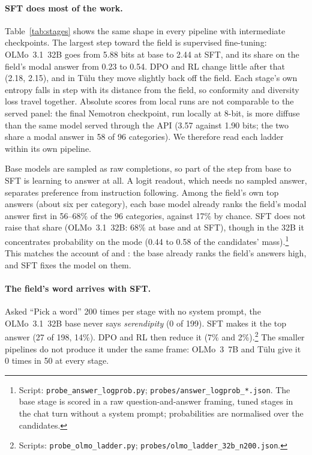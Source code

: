\documentclass[11pt]{article}
\begin{document}
\paragraph{SFT does most of the work.}
Table~\ref{tab:stages} shows the same shape in every pipeline with intermediate checkpoints. The largest step toward the field is supervised fine-tuning: OLMo~3.1~32B goes from 5.88 bits at base to 2.44 at SFT, and its share on the field's modal answer from 0.23 to 0.54. DPO and RL change little after that (2.18, 2.15), and in Tülu they move slightly back off the field. Each stage's own entropy falls in step with its distance from the field, so conformity and diversity loss travel together. Absolute scores from local runs are not comparable to the served panel: the final Nemotron checkpoint, run locally at 8-bit, is more diffuse than the same model served through the API (3.57 against 1.90 bits; the two share a modal answer in 58 of 96 categories). We therefore read each ladder within its own pipeline.

Base models are sampled as raw completions, so part of the step from base to SFT is learning to answer at all. A logit readout, which needs no sampled answer, separates preference from instruction following. Among the field's own top answers (about six per category), each base model already ranks the field's modal answer first in 56--68\% of the 96 categories, against 17\% by chance. SFT does not raise that share (OLMo~3.1~32B: 68\% at base and at SFT), though in the 32B it concentrates probability on the mode (0.44 to 0.58 of the candidates' mass).\footnote{Script: \texttt{probe\_answer\_logprob.py}; \texttt{probes/answer\_logprob\_*.json}. The base stage is scored in a raw question-and-answer framing, tuned stages in the chat turn without a system prompt; probabilities are normalised over the candidates.} This matches the account of \citet{fortier2026convergence} and \citet{samanta2026crystallization}: the base already ranks the field's answers high, and SFT fixes the model on them.

\paragraph{The field's word arrives with SFT.}
Asked ``Pick a word'' 200 times per stage with no system prompt, the OLMo~3.1~32B base never says \emph{serendipity} (0 of 199). SFT makes it the top answer (27 of 198, 14\%). DPO and RL then reduce it (7\% and 2\%).\footnote{Scripts: \texttt{probe\_olmo\_ladder.py}; \texttt{probes/olmo\_ladder\_32b\_n200.json}.} The smaller pipelines do not produce it under the same frame: OLMo~3~7B and Tülu give it 0 times in 50 at every stage.
\end{document}

